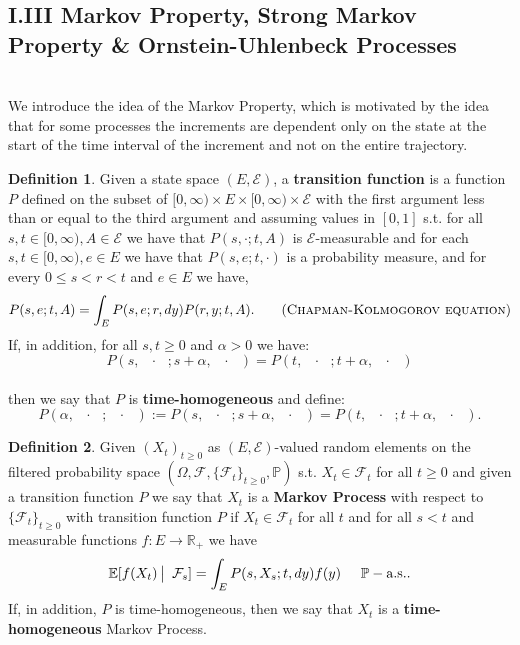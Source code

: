 \documentclass[12pt]{article}
\newcommand{\cF}{\mathcal{F}}
\newcommand{\E}{\mathbb{E}}
\newcommand{\R}{\mathbb{R}}
\newcommand{\Prb}{\mathbb{P}}
\newcommand{\quantifyspace}{\hspace{2px} \big | \hspace{5px}}
\newcommand{\cheekynewline}{$\text{ }$\\}
\newcommand{\cFPS}{(\Omega, \cF, \{ \cF_t\}_{t \geq 0}, \Prb)}
\newcommand{\cFi}{\{\cF_t\}_{t \geq 0}}
\newcommand{\spc}{\hspace{7 px}}
\newcommand{\als}{\text{a.s.}}
\newcommand{\spdot}{\text{ } \cdot \text{ }}
\theoremstyle{definition}
\newtheorem{defn}{Definition}
\begin{document}
\subsection*{ \quad I.III Markov Property, Strong Markov Property \& Ornstein-Uhlenbeck Processes}\label{sec:I.III}
\cheekynewline
We introduce the idea of the Markov Property, which is motivated by the idea that for some processes the increments are dependent only on the state at the start of the time interval of the increment and not on the entire trajectory. \\
\begin{defn}
    Given a state space $(E, \mathcal{E})$, a \textbf{transition function} is a function
    $P$ defined on the subset of $[0,\infty) \times E \times [0,\infty) \times \mathcal{E}$ with the first argument less than or equal to the third argument and assuming values in $[0,1]$ s.t.
    for all $s,t \in [0,\infty), A \in \mathcal{E}$ we have that $P(s, \cdot; t, A)$ is $\mathcal{E}$-measurable and
    for each $s,t \in [0,\infty), e \in E$ we have that $P(s, e; t, \cdot)$ is a probability measure, and for every $0 \leq s < r < t$ and $e \in E$ we have,
    \begin{equation}
        P(s, e; t, A) = \int_E P(s,e;r, dy) P(r, y; t, A).
        \tag{\textsc{Chapman-Kolmogorov equation}}
    \end{equation}
    If, in addition, for all $s,t \geq 0$ and $\alpha > 0$ we have: \\
    $$P(s, \spdot; s+\alpha, \spdot) = P(t, \spdot; t + \alpha, \spdot)$$ \\
    then we say that $P$ is \textbf{time-homogeneous} and define: \\
    $$P(\alpha, \spdot; \spdot) := P(s, \spdot; s+\alpha, \spdot) = P(t, \spdot; t+\alpha, \spdot).$$
\end{defn}

\begin{defn}
    Given $(X_t)_{t \geq 0}$ as $(E, \mathcal{E})$-valued random elements on the filtered probability space $\cFPS$ s.t. $X_t \in \cF_t$ for all $t \geq 0$
    and given a transition function $P$
    we say that $X_t$ is a \textbf{Markov Process} with respect to $\cFi$ with transition function $P$ if $X_t \in \cF_t$ for all $t$ and for all $s < t$ and measurable functions $f: E \to \R_+$ we have 
    \begin{equation*}
        \E[f(X_t) \quantifyspace \cF_s] = \int_E P(s, X_s; t, dy) f(y) \spc \spc \Prb-\als.
    \end{equation*}
    If, in addition, $P$ is time-homogeneous, then we say that $X_t$ is a \textbf{time-homogeneous} Markov Process. \\
\end{defn}
\end{document}
